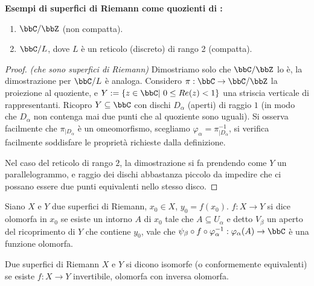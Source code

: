 \textbf{Esempi di superfici di Riemann come quozienti di \bbC:}
\begin{enumerate} %
  \item $\bbC/\bbZ$ (non compatta).
  \item $\bbC/L$, dove $L$ è un reticolo (discreto) di rango 2 (compatta).
\end{enumerate}
\begin{proof} \textit{(che sono superfici di Riemann)}
    Dimostriamo solo che $\bbC/\bbZ$ lo è, la dimostrazione per $\bbC/L$ è analoga. Considero $\pi:\bbC\rightarrow\bbC/\bbZ$ la proiezione al quoziente, e $Y:=\{z\in\bbC|\ 0\leq Re(z)<1\}$ una striscia verticale di rappresentanti. Ricopro $Y\subseteq\bbC$ con dischi $D_\alpha$ (aperti) di raggio $1$ (in modo che $D_\alpha$ non contenga mai due punti che al quoziente sono uguali). Si osserva facilmente che $\pi_{|D_\alpha}$ è un omeomorfismo, scegliamo $\varphi_\alpha=\pi_{|D_\alpha}^{-1}$, si verifica facilmente soddisfare le proprietà richieste dalla definizione.

    Nel caso del reticolo di rango $2$, la dimostrazione si fa prendendo come $Y$ un parallelogrammo, e raggio dei dischi abbastanza piccolo da impedire che ci possano essere due punti equivalenti nello stesso disco.
\end{proof}

\begin{definizione}
Siano $X$ e $Y$ due superfici di Riemann, $x_0\in X$, $y_0=f(x_0)$. $f:X\rightarrow Y$ si dice olomorfa in $x_0$ se esiste un intorno $A$ di $x_0$ tale che $A\subseteq U_\alpha$ e detto $V_\beta$ un aperto del ricoprimento di $Y$ che contiene $y_0$, vale che $\psi_\beta \circ f \circ \varphi_\alpha^{-1}: \varphi_\alpha(A)\rightarrow \bbC$ è una funzione olomorfa.
\end{definizione}


\begin{definizione}
Due superfici di Riemann $X$ e $Y$ si dicono isomorfe (o conformemente equivalenti) se esiste $f:X\rightarrow Y$ invertibile, olomorfa con inversa olomorfa.
\end{definizione}


